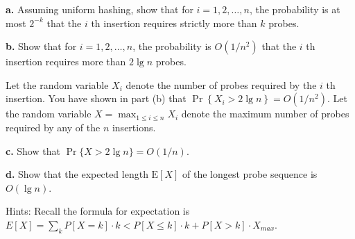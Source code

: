 \documentclass[11pt]{exam}
\begin{document}
\textbf{a.} Assuming uniform hashing, show that for $i=1,2, \ldots, n$, the probability is at most $2^{-k}$ that the $i$ th insertion requires strictly more than $k$ probes.

\textbf{b.} Show that for $i=1,2, \ldots, n$, the probability is $O\left(1 / n^{2}\right)$ that the $i$ th insertion requires more than $2 \lg n$ probes.

Let the random variable $X_{i}$ denote the number of probes required by the $i$ th insertion. You have shown in part (b) that $\operatorname{Pr}\left\{X_{i}>2 \lg n\right\}=O\left(1 / n^{2}\right)$. Let the random variable $X=\max _{1 \leq i \leq n}
    X_{i}$ denote the maximum number of probes required by any of the $n$ insertions.

\textbf{c.} Show that $\operatorname{Pr}\{X>2 \lg n\}=O(1 / n)$.

\textbf{d.} Show that the expected length $\mathrm{E}[X]$ of the longest probe sequence is $O(\lg n)$. \par
Hints: Recall the formula for expectation is $E[X] = \sum_{k} P[X = k]\cdot k < P[X \leq k] \cdot k + P[X > k] \cdot X_{max}$.

\begin{solution}
\end{solution}
\end{document}
